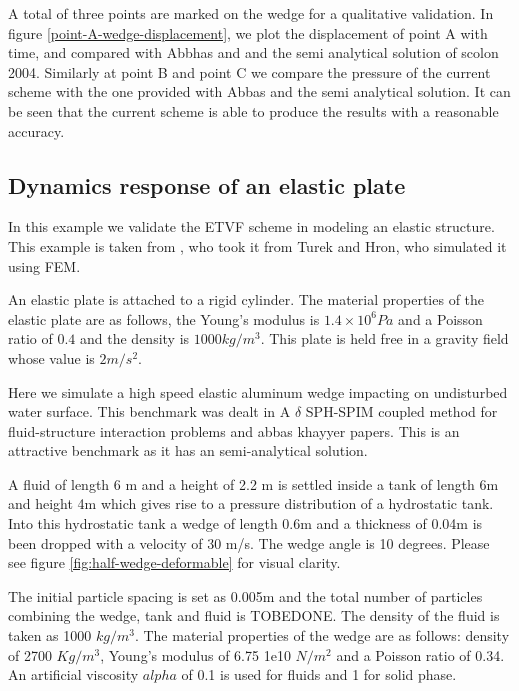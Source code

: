 \documentclass[preprint,12pt]{elsarticle}
\begin{document}
A total of three points are marked on the wedge for a qualitative validation.
In figure \ref{point-A-wedge-displacement}, we plot the displacement of point
A with time, and compared with Abbhas and and the semi analytical solution of
scolon 2004. Similarly at point B and point C we compare the pressure of the
current scheme with the one provided with Abbas and the semi analytical
solution. It can be seen that the current scheme is able to produce the
results with a reasonable accuracy.




\subsection{Dynamics response of an elastic plate}
\label{sec:elastic-plate}

In this example we validate the ETVF scheme in modeling an elastic structure.
This example is taken from \cite{Sun2019study}, who took it from Turek and
Hron, who simulated it using FEM.

An elastic plate is attached to a rigid cylinder. The material properties of
the elastic plate are as follows, the Young's modulus is $1.4\times10^6Pa$ and
a Poisson ratio of $0.4$ and the density is $1000 kg/m^3$. This plate is held
free in a gravity field whose value is $2m/s^2$.


Here we simulate a high speed elastic aluminum wedge impacting on undisturbed
water surface. This benchmark was dealt in
{A $\delta$ SPH-SPIM coupled method for fluid-structure interaction problems} and
{abbas khayyer} papers.
This is an attractive benchmark as it has an semi-analytical solution.

A fluid of length 6 m and a height of 2.2 m is settled inside a tank of length
6m and height 4m which gives rise to a pressure distribution of a hydrostatic
tank. Into this hydrostatic tank a wedge of length 0.6m and a thickness of
0.04m is been dropped with a velocity of 30 m/s. The wedge angle is 10
degrees. Please see figure \ref{fig:half-wedge-deformable} for visual clarity.

The initial particle spacing is set as 0.005m and the total number of
particles combining the wedge, tank and fluid is TOBEDONE. The density of the
fluid is taken as 1000 $kg/m^3$. The material properties of the wedge are as
follows: density of 2700 $Kg/m^3$, Young's modulus of 6.75 1e10 $N/m^2$ and a
Poisson ratio of 0.34. An artificial viscosity $alpha$ of 0.1 is used for
fluids and 1 for solid phase.
\end{document}
